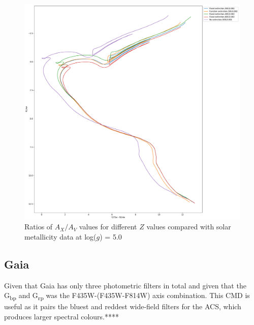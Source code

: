 \documentclass[12pt, a4paper]{report}
\begin{document}
\begin{figure}[h]
\begin{center}
\includegraphics[scale=0.3]{../basti_isochrones_10_13Gyr/Extinction_T50k_FeH0fix_func_f814w_f275wmf814w_500_400_600_Myr_FeH_0p002_ref_noext_Av_1p0.pdf}
\caption{Ratios of $A_{X}/A_{V}$ values for different $Z$ values compared with solar metallicity data at log($g$) = 5.0}
\label{wfc3_isoc2_T50k}
\end{center}
\end{figure}

\subsection{Gaia} \label{Gaia_isoc}

Given that Gaia has only three photometric filters in total and given that the G\textsubscript{bp} and G\textsubscript{rp}  was the F435W-(F435W-F814W) axis combination. This CMD is useful as it pairs the bluest and reddest wide-field filters for the ACS, which produces larger spectral colours.****
\end{document}
